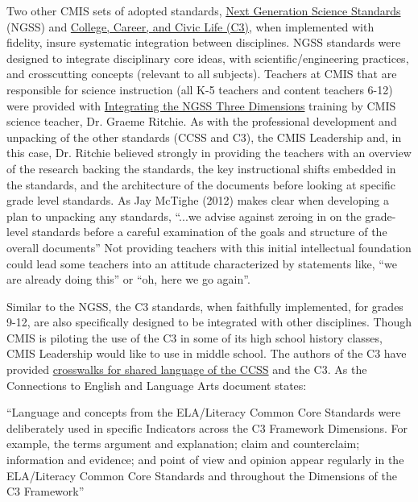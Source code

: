 \begin{findings}
Two other CMIS sets of adopted standards, \href{https://drive.google.com/a/cmis.ac.th/file/d/0B71_pYxcTLo-eUtQZE9DLTFvYUE/view?usp=sharing}{Next Generation Science Standards} (NGSS) and \href{https://drive.google.com/a/cmis.ac.th/file/d/0ByVFfrm0zfolbG9hN21kR2FXZVU/view?usp=sharing}{College, Career, and Civic Life (C3)}, when implemented with fidelity, insure systematic integration between disciplines. NGSS standards were designed to integrate disciplinary core ideas, with scientific/engineering practices, and crosscutting concepts (relevant to all subjects). Teachers at CMIS that are responsible for science instruction (all K-5 teachers and content teachers 6-12) were provided with \href{https://drive.google.com/drive/folders/0B7TDqZfXoqRrTjh1UFNhZjdqN28?usp=sharing}{Integrating the NGSS Three Dimensions} training by CMIS science teacher, Dr. Graeme Ritchie. As with the professional development and unpacking of the other standards (CCSS and C3), the CMIS Leadership and, in this case,  Dr. Ritchie believed strongly in providing the teachers with an overview of the research backing the standards, the key instructional shifts embedded in the standards, and the architecture of the documents before looking at specific grade level standards. As Jay McTighe (2012) makes clear when developing a plan to unpacking any standards, ``...we advise against zeroing in on the grade-level standards before a careful examination of the goals and structure of the overall documents'' Not providing teachers with this initial intellectual foundation could lead some teachers into an attitude characterized by statements like, ``we are already doing this'' or ``oh, here we go again''. 

Similar to the NGSS, the C3 standards, when faithfully implemented, for grades 9-12, are also specifically designed to be integrated with other disciplines. Though CMIS is piloting the use of the C3 in some of its high school history classes, CMIS Leadership would like to use in middle school. The authors of the C3 have provided \href{https://drive.google.com/drive/folders/0ByVFfrm0zfolN1pEVER5dW9zY0U}{crosswalks for shared language of the CCSS} and the C3. As the Connections to English and Language Arts document states:

``Language and concepts from the ELA/Literacy Common Core Standards were deliberately used in specific Indicators across the C3 Framework Dimensions. For example, the terms argument and explanation; claim and counterclaim; information and evidence; and point of view and opinion appear regularly in the ELA/Literacy Common Core Standards and throughout the Dimensions of the C3 Framework''


\end{findings}
